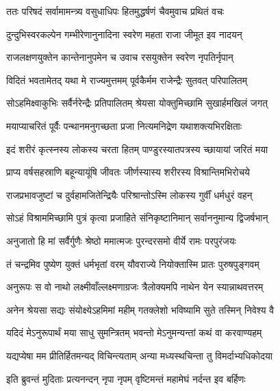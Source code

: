
\twolineshloka
{ततः परिषदं सर्वामामन्त्र्य वसुधाधिपः}
{हितमुद्धर्षणं चैवमुवाच प्रथितं वचः} %

\twolineshloka
{दुन्दुभिस्वरकल्पेन गम्भीरेणानुनादिना}
{स्वरेण महता राजा जीमूत इव नादयन्} %

\twolineshloka
{राजलक्षणयुक्तेन कान्तेनानुपमेन च}
{उवाच रसयुक्तेन स्वरेण नृपतिर्नृपान्} %

\twolineshloka
{विदितं भवतामेतद् यथा मे राज्यमुत्तमम्}
{पूर्वकैर्मम राजेन्द्रैः सुतवत् परिपालितम्} %

\twolineshloka
{सोऽहमिक्ष्वाकुभिः सर्वैर्नरेन्द्रैः प्रतिपालितम्}
{श्रेयसा योक्तुमिच्छामि सुखार्हमखिलं जगत्} %

\twolineshloka
{मयाप्याचरितं पूर्वैः पन्थानमनुगच्छता}
{प्रजा नित्यमनिद्रेण यथाशक्त्यभिरक्षिताः} %

\twolineshloka
{इदं शरीरं कृत्स्नस्य लोकस्य चरता हितम्}
{पाण्डुरस्यातपत्रस्य च्छायायां जरितं मया} %

\twolineshloka
{प्राप्य वर्षसहस्राणि बहून्यायूंषि जीवतः}
{जीर्णस्यास्य शरीरस्य विश्रान्तिमभिरोचये} %

\twolineshloka
{राजप्रभावजुष्टां च दुर्वहामजितेन्द्रियैः}
{परिश्रान्तोऽस्मि लोकस्य गुर्वीं धर्मधुरं वहन्} %

\twolineshloka
{सोऽहं विश्राममिच्छामि पुत्रं कृत्वा प्रजाहिते}
{संनिकृष्टानिमान् सर्वाननुमान्य द्विजर्षभान्} %

\twolineshloka
{अनुजातो हि मां सर्वैर्गुणैः श्रेष्ठो ममात्मजः}
{पुरन्दरसमो वीर्ये रामः परपुरंजयः} %

\twolineshloka
{तं चन्द्रमिव पुष्येण युक्तं धर्मभृतां वरम्}
{यौवराज्ये नियोक्तास्मि प्रातः पुरुषपुङ्गवम्} %

\twolineshloka
{अनुरूपः स वो नाथो लक्ष्मीवाँल्लक्ष्मणाग्रजः}
{त्रैलोक्यमपि नाथेन येन स्यान्नाथवत्तरम्} %

\twolineshloka
{अनेन श्रेयसा सद्यः संयोक्ष्येऽहमिमां महीम्}
{गतक्लेशो भविष्यामि सुते तस्मिन् निवेश्य वै} %

\twolineshloka
{यदिदं मेऽनुरूपार्थं मया साधु सुमन्त्रितम्}
{भवन्तो मेऽनुमन्यन्तां कथं वा करवाण्यहम्} %

\twolineshloka
{यद्यप्येषा मम प्रीतिर्हितमन्यद् विचिन्त्यताम्}
{अन्या मध्यस्थचिन्ता तु विमर्दाभ्यधिकोदया} %

\twolineshloka
{इति ब्रुवन्तं मुदिताः प्रत्यनन्दन् नृपा नृपम्}
{वृष्टिमन्तं महामेघं नर्दन्त इव बर्हिणः} %

